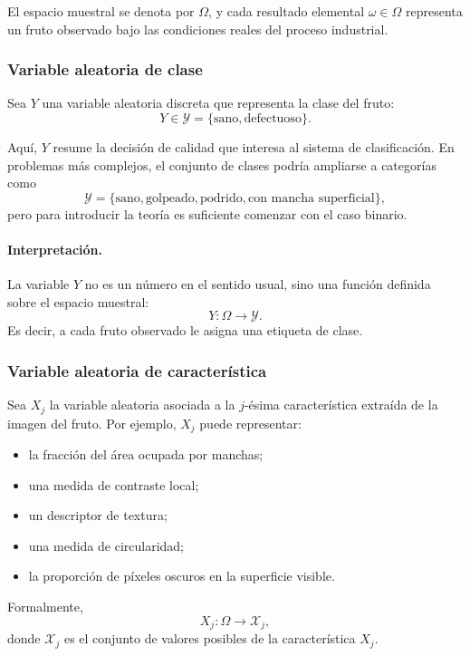 \documentclass{article}
\begin{document}
El espacio muestral se denota por \(\Omega\), y cada resultado elemental \(\omega \in \Omega\) representa un fruto observado bajo las condiciones reales del proceso industrial.

\subsubsection*{Variable aleatoria de clase}

Sea \(Y\) una variable aleatoria discreta que representa la clase del fruto:
\[
Y \in \mathcal{Y} = \{\text{sano}, \text{defectuoso}\}.
\]

Aquí, \(Y\) resume la decisión de calidad que interesa al sistema de clasificación. En problemas más complejos, el conjunto de clases podría ampliarse a categorías como
\[
\mathcal{Y}=\{\text{sano},\text{golpeado},\text{podrido},\text{con mancha superficial}\},
\]
pero para introducir la teoría es suficiente comenzar con el caso binario.

\paragraph{Interpretación.}
La variable \(Y\) no es un número en el sentido usual, sino una función definida sobre el espacio muestral:
\[
Y:\Omega \to \mathcal{Y}.
\]
Es decir, a cada fruto observado le asigna una etiqueta de clase.

\subsubsection*{Variable aleatoria de característica}

Sea \(X_j\) la variable aleatoria asociada a la \(j\)-ésima característica extraída de la imagen del fruto. Por ejemplo, \(X_j\) puede representar:

\begin{itemize}
\item la fracción del área ocupada por manchas;
\item una medida de contraste local;
\item un descriptor de textura;
\item una medida de circularidad;
\item la proporción de píxeles oscuros en la superficie visible.
\end{itemize}

Formalmente,
\[
X_j:\Omega \to \mathcal{X}_j,
\]
donde \(\mathcal{X}_j\) es el conjunto de valores posibles de la característica \(X_j\).
\end{document}

